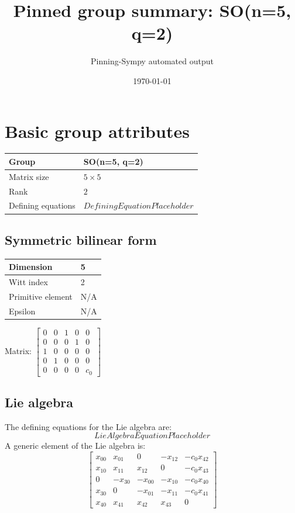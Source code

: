 \documentclass[11pt]{article}
\title{Pinned group summary: SO(n=5, q=2)}
\author{Pinning-Sympy automated output}
\date{\today}
\theoremstyle{definition}
\begin{document}
\maketitle
\tableofcontents

\newpage

\section{Basic group attributes}

\begin{tabular}{|l|l|}
	\hline
    Group & SO(n=5, q=2) \\
	\hline
    Matrix size & $5 \times 5$ \\
	\hline
    Rank & $2$ \\
	\hline
	Defining equations & $DefiningEquationPlaceholder$ \\
	\hline
\end{tabular}

\subsection{Symmetric bilinear form}
\begin{tabular}{|l|l|}
    \hline
    Dimension & 5 \\
    \hline
    Witt index & 2 \\
    \hline
    Primitive element & N/A \\
    \hline
    Epsilon & N/A \\
    \hline
\end{tabular}

\bigskip
\noindent Matrix: \(
\left[\begin{matrix}0 & 0 & 1 & 0 & 0\\0 & 0 & 0 & 1 & 0\\1 & 0 & 0 & 0 & 0\\0 & 1 & 0 & 0 & 0\\0 & 0 & 0 & 0 & c_{0}\end{matrix}\right]
\)



\subsection{Lie algebra}

The defining equations for the Lie algebra are:
\[
LieAlgebraEquationPlaceholder
\]
A generic element of the Lie algebra is:
\[
\left[\begin{matrix}x_{0 0} & x_{0 1} & 0 & - x_{1 2} & - c_{0} x_{4 2}\\x_{1 0} & x_{1 1} & x_{1 2} & 0 & - c_{0} x_{4 3}\\0 & - x_{3 0} & - x_{0 0} & - x_{1 0} & - c_{0} x_{4 0}\\x_{3 0} & 0 & - x_{0 1} & - x_{1 1} & - c_{0} x_{4 1}\\x_{4 0} & x_{4 1} & x_{4 2} & x_{4 3} & 0\end{matrix}\right]
\]
\end{document}

